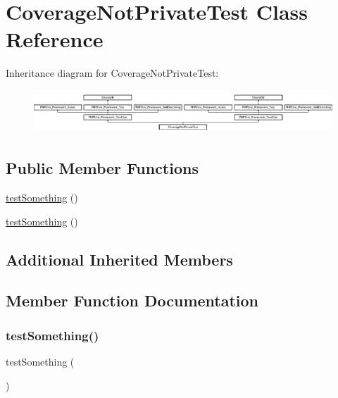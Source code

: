 \hypertarget{class_coverage_not_private_test}{}\section{Coverage\+Not\+Private\+Test Class Reference}
\label{class_coverage_not_private_test}
Inheritance diagram for Coverage\+Not\+Private\+Test\+:\begin{figure}[H]
\begin{center}
\leavevmode
\includegraphics[height=1.651917cm]{class_coverage_not_private_test}
\end{center}
\end{figure}
\subsection*{Public Member Functions}
\begin{DoxyCompactItemize}
\item 
\mbox{\hyperlink{class_coverage_not_private_test_a0fc4e17369bc9607ebdd850d9eda8167}{test\+Something}} ()
\item 
\mbox{\hyperlink{class_coverage_not_private_test_a0fc4e17369bc9607ebdd850d9eda8167}{test\+Something}} ()
\end{DoxyCompactItemize}
\subsection*{Additional Inherited Members}


\subsection{Member Function Documentation}
\mbox{\label{class_coverage_not_private_test_a0fc4e17369bc9607ebdd850d9eda8167}} 
\subsubsection{\texorpdfstring{test\+Something()}{testSomething()}\hspace{0.1cm}{\footnotesize\ttfamily [1/2]}}
{\footnotesize\ttfamily test\+Something (\begin{DoxyParamCaption}{ }\end{DoxyParamCaption})}


